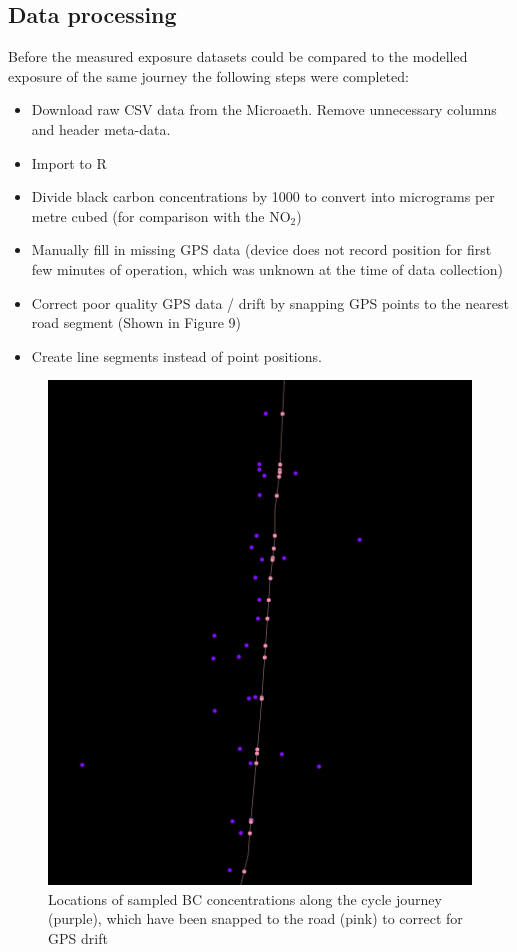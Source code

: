 \subsection{Data processing}
\label{subsec:dataprocessing}

Before the measured exposure datasets could be compared to the modelled exposure of the same journey the following steps were completed:

\begin{itemize}
    \item Download raw CSV data from the Microaeth. Remove unnecessary columns and header meta-data.
    \item Import to R
    \item Divide black carbon concentrations by 1000 to convert into micrograms per metre cubed (for comparison with the NO$_{2}$)
    \item Manually fill in missing GPS data (device does not record position for first few minutes of operation, which was unknown at the time of data collection)
    \item Correct poor quality GPS data / drift by snapping GPS points to the nearest road segment (Shown in Figure 9)
    \item Create line segments instead of point positions.
\end{itemize}

\begin{figure}[H]
\centering
\includegraphics[scale=0.4]{images/snapping_cycle_to_road.png}
\caption{Locations of sampled BC concentrations along the cycle journey (purple), which have been snapped to the road (pink) to correct for GPS drift}
\label{fig:snapping_cycle_to_road}
\end{figure}

